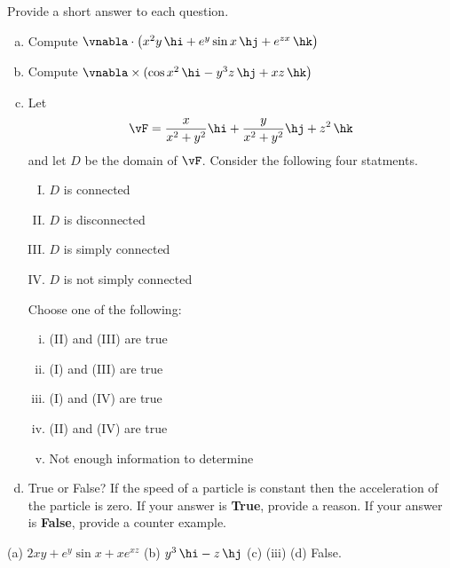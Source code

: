 \begin{question}[M317 2012J] %
Provide a short answer to each question.
\begin{enumerate}[(a)]
\item
Compute $\vnabla\cdot\big(x^2 y\,\hi + e^y \sin x\,\hj + e^{zx}\,\hk\big)$
\item
Compute $\vnabla\times(\cos x^2\,\hi - y^3 z\,\hj + xz\,\hk\big)$
\item
Let
\begin{equation*}
\vF = \frac{x}{x^2+y^2}\hi +\frac{y}{x^2+y^2}\hj +z^2\,\hk
\end{equation*}
and let $D$ be the domain of $\vF$. Consider the following four
statments.
\begin{enumerate}[(I)]
\item  $D$ is connected
\item  $D$ is disconnected
\item  $D$ is simply connected
\item  $D$ is not simply connected
\end{enumerate}
Choose one of the following:
\begin{enumerate}[(i)]
\item (II) and (III) are true
\item (I) and (III) are true
\item (I) and (IV) are true
\item (II) and (IV) are true
\item Not enough information to determine
\end{enumerate}

\item
True or False? If the speed of a particle is constant then the 
acceleration of the particle is zero. If your answer is \textbf{True}, 
provide a reason. If your answer is \textbf{False}, provide a counter example.

\end{enumerate}
\end{question}

%

\begin{answer} 
\item %
(a) $2xy + e^y\sin x + xe^{xz}$\qquad
(b) $y^3\,\hi-z\,\hj$\qquad
(c) (iii)\qquad
(d) False.
\end{answer}

